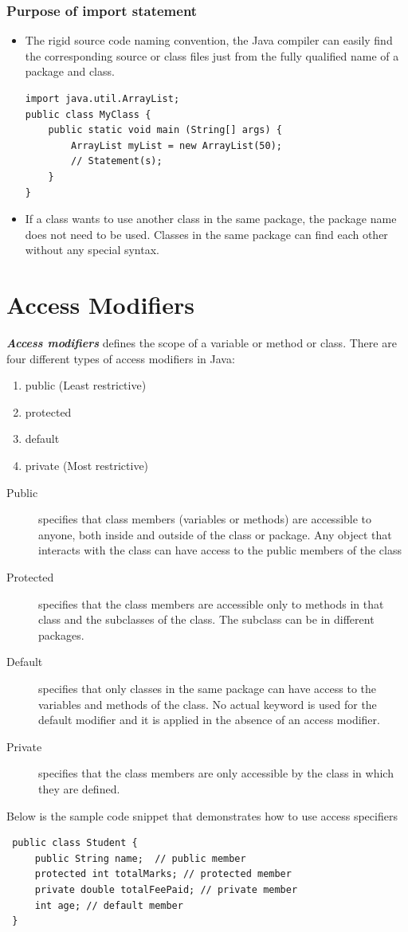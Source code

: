 \documentclass[11pt,a4paper]{article}
\begin{document}
 \subsubsection*{Purpose of import statement}
  \begin{itemize}
   \item The rigid source code naming convention, the Java compiler can easily find the corresponding source or class files just from the fully qualified name of a package and class.
\begin{lstlisting}
import java.util.ArrayList;
public class MyClass {
    public static void main (String[] args) {
        ArrayList myList = new ArrayList(50);
        // Statement(s);
    }
}
\end{lstlisting}
\item If a class wants to use another class in the same package, the package name does not need to be used. Classes in the same package can find each other without any special syntax.  
\end{itemize}

\section*{Access Modifiers}
\emph{\textbf{Access modifiers}} defines the scope of a variable or method or class. There are four different types of access modifiers in Java:
\begin{enumerate}
 \item public (Least restrictive)
 \item protected
 \item default
 \item private (Most restrictive)
\end{enumerate}

\begin{description}
 \item [Public] specifies that class members (variables or methods) are accessible to anyone, both inside and outside of the class or package. Any object that interacts with the class can have access to the public members of the class
 \item [Protected] specifies that the class members are accessible only to methods in that class and the subclasses of the class. The subclass can be in different packages.
 \item [Default] specifies that only classes in the same package can have access to the variables and methods of the class. No actual keyword is used for the default modifier and it is applied in the absence of an access modifier.
 \item [Private] specifies that the class members are only accessible by the class in which they are defined.
\end{description}
Below is the sample code snippet that demonstrates how to use access specifiers
\begin{lstlisting}
 public class Student {
     public String name;  // public member
     protected int totalMarks; // protected member
     private double totalFeePaid; // private member
     int age; // default member
 }
\end{lstlisting}
\end{document}
